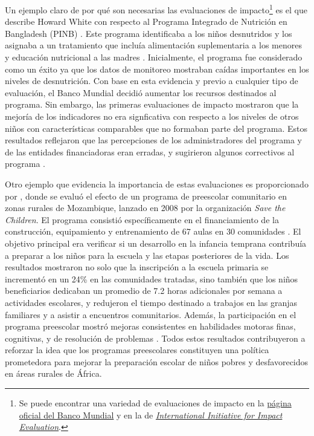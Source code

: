 \documentclass[../../main.tex]{subfiles}
\begin{document}
Un ejemplo claro de por qué son necesarias las evaluaciones de impacto\footnote{Se puede
encontrar una variedad de evaluaciones de impacto en la
\href{https://www.worldbank.org/en/about/unit/unit-dec/impactevaluation/programs}{página
oficial del Banco Mundial} y en la de
\href{https://developmentevidence.3ieimpact.org/search-results?search_text=aW1wYWN0IGV2YWx1YXRpb24=&page=1&per_page=50&sort_by=relevance&filters=}{\textit{International
Initiative for Impact Evaluation}}.} es el que describe Howard White con respecto al
Programa Integrado de Nutrición en Bangladesh (PINB) \cite{white2009theory}. Este programa
identificaba a los niños desnutridos y los asignaba a un tratamiento que incluía
alimentación suplementaria a los menores y educación nutricional a las madres
\cite{bernal}. Inicialmente, el programa fue considerado como un éxito ya que los datos de
monitoreo mostraban caídas importantes en los niveles de desnutrición. Con base en esta
evidencia y previo a cualquier tipo de evaluación, el Banco Mundial decidió aumentar los
recursos destinados al programa. Sin embargo, las primeras evaluaciones de impacto
mostraron que la mejoría de los indicadores no era signficativa con respecto a los niveles
de otros niños con características comparables que no formaban parte del programa. Estos
resultados reflejaron que las percepciones de los administradores del programa y de las
entidades financiadoras eran erradas, y sugirieron algunos correctivos al programa
\cite{bernal}.

Otro ejemplo que evidencia la importancia de estas evaluaciones es proporcionado por
\cite{preschool-africa-2012}, donde se evaluó el efecto de un programa de preescolar
comunitario en zonas rurales de Mozambique, lanzado en 2008 por la organización \textit{Save the
Children}. El programa consistió específicamente en el financiamiento de la construcción,
equipamiento y entrenamiento de 67 aulas en 30 comunidades \cite{preschool-africa-2012}. El
objetivo principal era verificar si un desarrollo en la infancia temprana contribuía a
preparar a los niños para la escuela y las etapas posteriores de la vida. Los resultados
mostraron no solo que la inscripción a la escuela primaria se incrementó en un 24\% en las
comunidades tratadas, sino también que los niños beneficiarios dedicaban un promedio de
7.2 horas adicionales por semana a actividades escolares, y redujeron el tiempo destinado a
trabajos en las granjas familiares y a asistir a encuentros comunitarios. Además, la
participación en el programa preescolar mostró mejoras consistentes en habilidades motoras
finas, cognitivas, y de resolución de problemas \cite{preschool-africa-2012}. Todos estos
resultados contribuyeron a reforzar la idea que los programas preescolares constituyen
una política prometedora para mejorar la preparación escolar de niños pobres y
desfavorecidos en áreas rurales de África.
\end{document}
